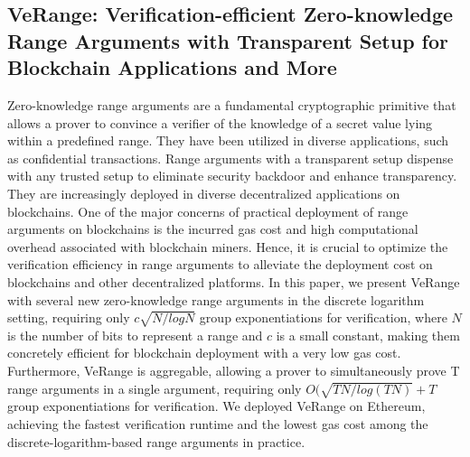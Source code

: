 \documentclass[11pt]{article}
\theoremstyle{definition}
\theoremstyle{remark}
\theoremstyle{plain}
\begin{document}
\subsection{\cite{10.1145/3708821.3710842} VeRange: Verification-efficient Zero-knowledge Range Arguments with Transparent Setup for Blockchain Applications and More}
Zero-knowledge range arguments are a fundamental cryptographic primitive that allows a prover to convince a verifier of the knowledge of a secret value lying within a predefined range. They have been utilized in diverse applications, such as confidential transactions. Range arguments with a transparent setup dispense with any trusted setup to eliminate security backdoor and enhance transparency. They are increasingly deployed in diverse decentralized applications on blockchains. One of the major concerns of practical deployment of range arguments on blockchains is the incurred gas cost and high computational overhead associated with blockchain miners. Hence, it is crucial to optimize the verification efficiency in range arguments to alleviate the deployment cost on blockchains and other decentralized platforms. In this paper, we present VeRange with several new zero-knowledge range arguments in the discrete logarithm setting, requiring only $c \sqrt{N/log N}$ group exponentiations for verification, where $N$ is the number of bits to represent a range and $c$ is a small constant, making them concretely efficient for blockchain deployment with a very low gas cost. Furthermore, VeRange is aggregable, allowing a prover to simultaneously prove T range arguments in a single argument, requiring only $O(\sqrt{TN/log(TN)} + T$ group exponentiations for verification. We deployed VeRange on Ethereum, achieving the fastest verification runtime and the lowest gas cost among the discrete-logarithm-based range arguments in practice.
\end{document}
